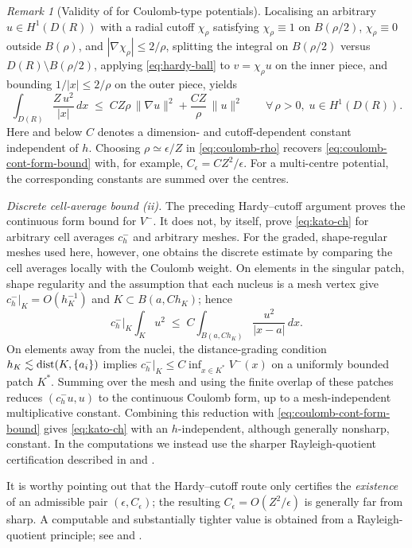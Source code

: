 \documentclass[11pt]{article}
\theoremstyle{plain}
\theoremstyle{definition}
\theoremstyle{remark}
\newtheorem{remark}{Remark}
\begin{document}
\begin{remark}[Validity of  for Coulomb-type potentials]
Localising an arbitrary $u\in H^1(D(R))$ with a radial cutoff
$\chi_\rho$ satisfying $\chi_\rho\equiv 1$ on $B(\rho/2)$,
$\chi_\rho\equiv 0$ outside $B(\rho)$, and $|\nabla\chi_\rho|\le 2/\rho$,
splitting the integral on $B(\rho/2)$ versus $D(R)\setminus B(\rho/2)$,
applying \eqref{eq:hardy-ball} to $v=\chi_\rho u$ on the inner piece, and
bounding $1/|x|\le 2/\rho$ on the outer piece, yields
\begin{equation}
\label{eq:coulomb-rho}
  \int_{D(R)}\frac{Z\,u^2}{|x|}\,dx
  \;\le\; C Z\rho\,\|\nabla u\|^2 + \frac{C Z}{\rho}\,\|u\|^2
  \qquad\forall\,\rho>0,\;u\in H^1(D(R)).
\end{equation}
Here and below $C$ denotes a dimension- and cutoff-dependent constant
independent of $h$. Choosing $\rho\simeq\epsilon/Z$ in
\eqref{eq:coulomb-rho} recovers \eqref{eq:coulomb-cont-form-bound} with,
for example, $C_\epsilon=CZ^2/\epsilon$.  For a multi-centre potential,
the corresponding constants are summed over the centres.

\smallskip
\noindent\emph{Discrete cell-average bound (ii).}
The preceding Hardy--cutoff argument proves the continuous form
bound for $V^-$. It does not, by itself, prove
\eqref{eq:kato-ch} for arbitrary cell averages $c_h^-$ and arbitrary
meshes. For the graded, shape-regular meshes used here, however,
one obtains the discrete estimate by comparing the cell averages
locally with the Coulomb weight. On elements in the singular patch,
shape regularity and the assumption that each nucleus is a mesh
vertex give $c_h^-|_K=O(h_K^{-1})$ and
$K\subset B(a,Ch_K)$; hence
\[
  c_h^-|_K\int_K u^2
  \;\le\;
  C\int_{B(a,Ch_K)}\frac{u^2}{|x-a|}\,dx .
\]
On elements away from the nuclei, the distance-grading condition
$h_K\lesssim{\rm dist}(K,\{a_i\})$ implies
$c_h^-|_K\le C\inf_{x\in K^\ast}V^-(x)$ on a uniformly bounded
patch $K^\ast$. Summing over the mesh and using the finite overlap
of these patches reduces \((c_h^-u,u)\) to the continuous Coulomb
form, up to a mesh-independent multiplicative constant. Combining
this reduction with \eqref{eq:coulomb-cont-form-bound} gives \eqref{eq:kato-ch}
with an $h$-independent, although generally nonsharp, constant.
In the computations we instead use the sharper Rayleigh-quotient
certification described in  and
.

It is worthy pointing out that the Hardy--cutoff route only certifies the \emph{existence} of an
admissible pair $(\epsilon,C_\epsilon)$; the resulting
$C_\epsilon=O(Z^2/\epsilon)$ is generally far from sharp.  A computable
and substantially tighter value is obtained from a Rayleigh-quotient
principle; see  and .
\end{remark}
\end{document}
